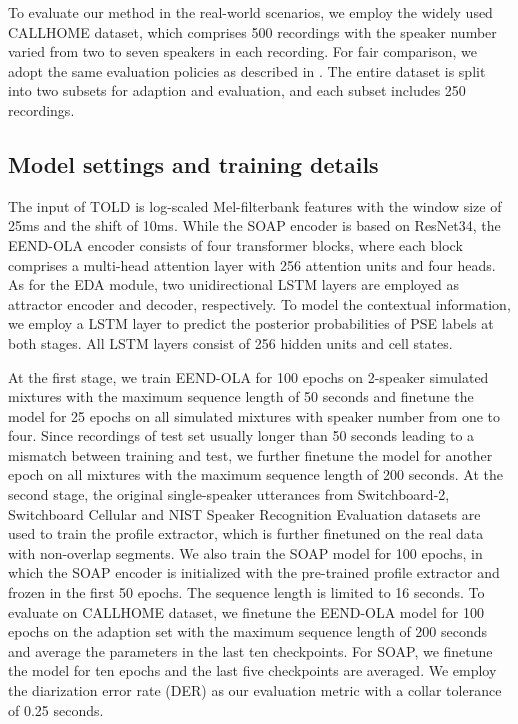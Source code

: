 \documentclass{article}
\begin{document}
To evaluate our method in the real-world scenarios, we employ the widely used CALLHOME dataset, which comprises 500 recordings with the speaker number varied from two to seven speakers in each recording. For fair comparison, we adopt the same evaluation policies as described in \cite{EEND_EDA}. The entire dataset is split into two subsets for adaption and evaluation, and each subset includes 250 recordings.

\subsection{Model settings and training details}
\label{subsec:setting}
The input of TOLD is log-scaled Mel-filterbank features with the window size of 25ms and the shift of 10ms. While the SOAP encoder is based on ResNet34, the EEND-OLA encoder consists of four transformer blocks, where each block comprises a multi-head attention layer with 256 attention units and four heads. As for the EDA module, two unidirectional LSTM layers are employed as attractor encoder and decoder, respectively. To model the contextual information, we employ a LSTM layer to predict the posterior probabilities of PSE labels at both stages. All LSTM layers consist of 256 hidden units and cell states.

At the first stage, we train EEND-OLA for 100 epochs on 2-speaker simulated mixtures with the maximum sequence length of 50 seconds and finetune the model for 25 epochs on all simulated mixtures with speaker number from one to four. Since recordings of test set usually longer than 50 seconds leading to a mismatch between training and test, we further finetune the model for another epoch on all mixtures with the maximum sequence length of 200 seconds.
At the second stage, the original single-speaker utterances from Switchboard-2, Switchboard Cellular and NIST Speaker Recognition Evaluation datasets are used to train the profile extractor, which is further finetuned on the real data with non-overlap segments.
We also train the SOAP model for 100 epochs, in which the SOAP encoder is initialized with the pre-trained profile extractor and frozen in the first 50 epochs. The sequence length is limited to 16 seconds.
To evaluate on CALLHOME dataset, we finetune the EEND-OLA model for 100 epochs on the adaption set with the maximum sequence length of 200 seconds and average the parameters in the last ten checkpoints. For SOAP, we finetune the model for ten epochs and the last five checkpoints are averaged. We employ the diarization error rate (DER) as our evaluation metric with a collar tolerance of 0.25 seconds.
\end{document}
